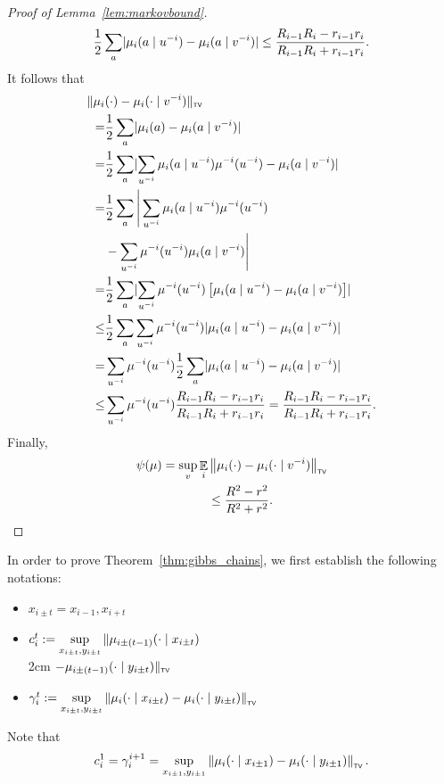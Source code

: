 \documentclass[12pt,a4paper,oneside,onecolumn]{book}
\def\hspace#1{}%
\begin{document}
\begin{proof}[Proof of Lemma~\ref{lem:markovbound}]
\begin{align*}
  \frac{1}{2}\sum_{a}\lvert\mu_i(a\mid u^{-i}) - \mu_i(a\mid v^{-i})\rvert
  \leq \frac{R_{i-1}R_i - r_{i-1}r_i}{R_{i-1}R_i + r_{i-1}r_i}.
\end{align*}
It follows that
\begin{align*}
  \Vert \mu_i&(\cdot)- \mu_i(\cdot\mid v^{-i}){\Vert}_{\textup{\tiny\textsf{TV}}} \\
  =& \frac{1}{2}\sum_{a}\lvert\mu_i(a) - \mu_i(a\mid v^{-i})\rvert \\
  =& \frac{1}{2}\sum_{a}\lvert
    \sum_{u^{-i}}\mu_i(a\mid u^{-i})\mu^{-i}(u^{-i}) - \mu_i(a\mid v^{-i})\rvert \\
  =& \frac{1}{2}\sum_{a}\Bigg|\sum_{u^{-i}}\mu_i(a\mid u^{-i})\mu^{-i}(u^{-i}) \\
    &- \sum_{u^{-i}}\mu^{-i}(u^{-i})\mu_i(a\mid v^{-i})\Bigg| \\
  =& \frac{1}{2}\sum_{a}\lvert\sum_{u^{-i}}\mu^{-i}(u^{-i})\left[
    \mu_i(a\mid u^{-i}) - \mu_i(a\mid v^{-i})
    \right]\rvert \\
  \leq& \frac{1}{2}\sum_{a}\sum_{u^{-i}}\mu^{-i}(u^{-i})\lvert
    \mu_i(a\mid u^{-i}) - \mu_i(a\mid v^{-i})\rvert \\
  =& \sum_{u^{-i}}\mu^{-i}(u^{-i})\frac{1}{2}\sum_{a}\lvert
    \mu_i(a\mid u^{-i}) - \mu_i(a\mid v^{-i})\rvert \\
  \leq& \sum_{u^{-i}}\mu^{-i}(u^{-i})\frac{R_{i-1}R_i - r_{i-1}r_i}{R_{i-1}R_i + r_{i-1}r_i}
    = \frac{R_{i-1}R_i - r_{i-1}r_i}{R_{i-1}R_i + r_{i-1}r_i}
    .
\end{align*}
Finally,
\begin{align*}
  \psi(\mu)
  = \sup_{v}\mathop{\mathbb{E}}_{i}&\left\lVert\mu_i(\cdot) - \mu_i(\cdot\mid v^{-i})\right\rVert_{\textup{\tiny\textsf{TV}}} \\
  &\leq \frac{R^2 - r^2}{R^2 + r^2}
  .
\end{align*}
\end{proof}


In order to prove Theorem~\ref{thm:gibbs_chains}, we first
establish the following notations:
\begin{itemize}
\item $x_{i \pm t} = x_{i-1},x_{i+t}$

\item $c_i^t := \sup\limits_{x_{i\pm t},y_{i\pm t}} \Vert\mu_{i\pm (t-1)}(\cdot\mid x_{i\pm t})$ \\
\hspace*{2cm} $- \mu_{i\pm(t-1)}(\cdot\mid y_{i\pm t}){\Vert}_{\textup{\tiny\textsf{TV}}}$
\item $\gamma_{i}^{t}
  := \sup\limits_{x_{i\pm t},y_{i\pm t}}\left\lVert\mu_i(\cdot\mid x_{i\pm t}) - \mu_i(\cdot\mid y_{i\pm t})\right\rVert_{\textup{\tiny\textsf{TV}}}$
\end{itemize}
Note that $$c_i^1 = \gamma_{i}^{i+1}
= \sup_{x_{i\pm 1},y_{i\pm 1}}\left\lVert\mu_i(\cdot\mid x_{i\pm 1}) - \mu_i(\cdot\mid y_{i\pm 1})\right\rVert_{\textup{\tiny\textsf{TV}}}.$$
\end{document}
